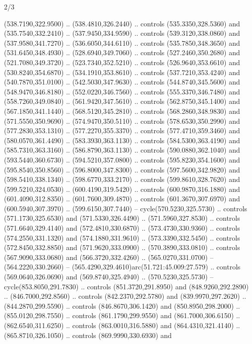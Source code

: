 \begin{flagdescription}{2/3}
\begin{scope}[xshift=\flaglength/2,yshift=\flagwidth/2,scale=\flagwidth/341]
\begin{scope}[xshift=-20mm,yshift=38.3mm,scale=0.1565]
\begin{scope}[y=0.80pt, x=0.80pt, yscale=-1, xscale=1,draw=gold,fill=white]
\begin{scope}[line join=round,line cap=round,line width=1.016\lw]
\begin{scope}[fill]
  (538.7190,322.9500) .. (538.4810,326.2440) .. controls (535.3350,328.5360) and
  (535.7540,332.2410) .. (537.9450,334.9590) .. controls (539.3120,338.0860) and
  (537.9580,341.7270) .. (536.6050,344.6110) .. controls (535.7850,348.3650) and
  (531.6450,348.4930) .. (528.6940,349.7060) .. controls (527.2460,350.2680) and
  (521.7080,349.3720) .. (523.7340,352.5210) .. controls (526.9640,353.6610) and
  (530.8240,354.6870) .. (534.1910,353.8610) .. controls (537.7210,353.4240) and
  (540.7870,351.0100) .. (542.5030,347.9630) .. controls (544.8740,345.5600) and
  (548.9470,346.8180) .. (552.0220,346.7560) .. controls (555.3370,346.7480) and
  (558.7260,349.0840) .. (561.9420,347.5610) .. controls (562.8750,345.1400) and
  (567.1850,341.1440) .. (568.5120,345.2810) .. controls (568.2860,348.9830) and
  (571.5550,350.9690) .. (574.9470,350.5110) .. controls (578.6530,350.2990) and
  (577.2830,353.1310) .. (577.2270,355.3370) .. controls (577.4710,359.3460) and
  (580.0570,361.4490) .. (583.3930,363.1130) .. controls (584.5300,363.4190) and
  (585.7310,363.3160) .. (586.8790,363.1130) .. controls (590.0880,362.1040) and
  (593.5440,360.6730) .. (594.5210,357.0800) .. controls (595.8230,354.1600) and
  (595.8540,350.8560) .. (596.8000,347.8300) .. controls (597.5600,342.9820) and
  (598.5410,338.1340) .. (598.6770,333.2170) .. controls (599.8610,328.7620) and
  (599.5210,324.0530) .. (600.4190,319.5420) .. controls (600.9870,316.1880) and
  (601.4090,312.8350) .. (601.7600,309.4870) .. controls (601.3670,307.6970) and
  (600.5940,307.3970) .. (599.6150,307.7440) -- cycle(570.5230,325.5730) ..
  controls (571.1730,325.6530) and (571.5330,326.4490) .. (571.5960,327.8530) ..
  controls (571.6640,329.4140) and (572.4810,330.6870) .. (573.4730,330.9360) ..
  controls (574.2550,331.1320) and (574.1880,331.9610) .. (573.3390,332.5450) ..
  controls (572.8450,332.8850) and (571.9620,333.0900) .. (570.3890,333.0810) ..
  controls (567.9090,333.0680) and (566.3720,332.4260) .. (565.0270,331.0700) --
  (564.2220,330.2660) -- (565.4290,329.4610)arc(51.721:45.009:27.579) ..
  controls (569.0640,326.0690) and (569.8740,325.4940) .. (570.5230,325.5730) --
  cycle(853.8050,291.7830) .. controls (851.3720,291.8950) and
  (848.9260,292.2890) .. (846.7000,292.8560) .. controls (842.2370,292.5780) and
  (839.9970,297.2620) .. (844.2870,299.5590) .. controls (846.8670,306.1420) and
  (850.8950,298.2000) .. (855.0120,298.7550) .. controls (861.1790,299.9550) and
  (861.7000,306.6150) .. (862.6540,311.6250) .. controls (863.0010,316.5880) and
  (864.4310,321.4140) .. (865.8710,326.1050) .. controls (869.9990,330.6930) and

\end{scope}
\end{scope}
\end{scope}
\end{scope}
\end{scope}
\end{flagdescription}
